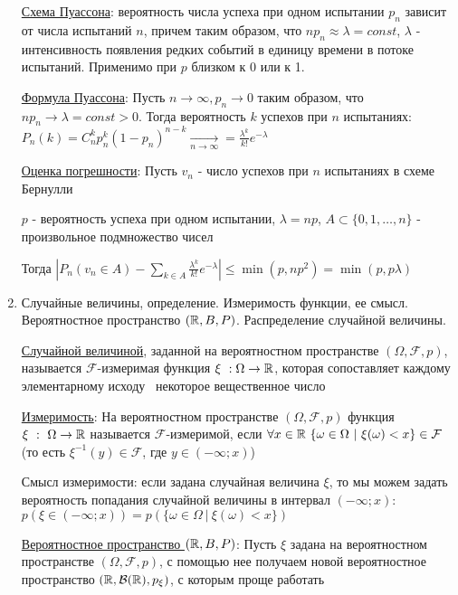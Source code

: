 \documentclass[12pt]{article}
\begin{document}
\begin{enumerate}
    \hyperlink{poissonschema}{Схема Пуассона}: вероятность числа успеха при одном испытании $p_n$ зависит от числа испытаний $n$, причем таким образом, что $n p_n \approx \lambda = const$, 
    $\lambda$ - интенсивность появления редких событий в единицу времени в потоке испытаний. Применимо при $p$ близком к 0 или к 1.

    \hyperlink{poissonformula}{Формула Пуассона}: \Ths Пусть $n \to \infty, p_n \to 0$ таким образом, что $n p_n \to \lambda = const > 0$.
    Тогда вероятность $k$ успехов при $n$ испытаниях: $P_n(k) = C^k_n p_n^k (1 - p_n)^{n - k} \underset{n \to \infty}{\rightarrow} = \frac{\lambda^k}{k!} e^{-\lambda}$

    \hyperlink{errorinpoissonformula}{Оценка погрешности}: \Ths Пусть $v_n$ - число успехов при $n$ испытаниях в схеме Бернулли

    $p$ - вероятность успеха при одном испытании, $\lambda = np$, $A \subset \{0, 1, \dots, n\}$ - произвольное подмножество чисел

    Тогда $|P_n (v_n \in A) - \sum_{k \in A} \frac{\lambda^k}{k!} e^{-\lambda}| \leq \min (p, np^2) = \min (p, p\lambda)$

    \item Случайные величины, определение. Измеримость функции, ее смысл. Вероятностное пространство $(\mathbb{R}, B, P)$. Распределение случайной величины.

    \hyperlink{randomvaluedefinition}{Случайной величиной}, заданной на вероятностном пространстве $(\Omega, \mathcal{F}, p)$, называется
    $\mathcal{F}$-измеримая функция $\xi \ : \Omega \to \mathbb{R}$, которая сопоставляет каждому элементарному исходу \
    некоторое вещественное число

    \hyperlink{measurabilityoffunction}{Измеримость}: На вероятностном пространстве $(\Omega, \mathcal{F}, p)$ функция $\xi \ : \ \Omega \to \mathbb{R}$ называется
    $\mathcal{F}$-измеримой, если $\forall x \in \mathbb{R} \ \{\omega \in \Omega \ | \ \xi(\omega) < x\} \in \mathcal{F}$
    (то есть $\xi^{-1}(y) \in \mathcal{F}$, где $y \in (-\infty; x)$)

    Смысл измеримости: если задана случайная величина $\xi$, то мы можем задать вероятность попадания случайной
    величины в интервал $(-\infty; x)$: $p(\xi \in (-\infty; x)) = p(\{\omega \in \Omega \ | \ \xi(\omega) < x\})$

    \hyperlink{probabilityspacerbp}{Вероятностное пространство $(\mathbb{R}, B, P)$}: Пусть $\xi$ задана на вероятностном пространстве $(\Omega, \mathcal{F}, p)$, с помощью нее получаем новой вероятностное
    пространство $(\mathbb{R}, \mathcal{B}(\mathbb{R}), p_\xi)$, с которым проще работать


\end{enumerate}
\end{document}
